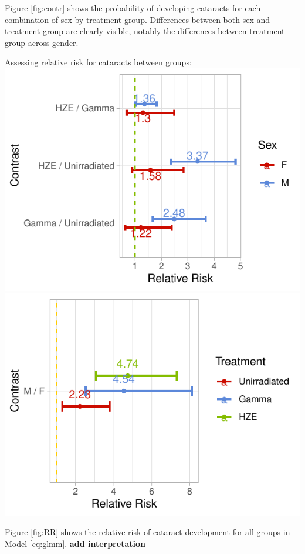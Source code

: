 \documentclass[12pt]{article}
\begin{document}
Figure \ref{fig:contr} shows the probability of developing cataracts for each combination of sex by treatment group. Differences between both sex and treatment group are clearly visible, notably the differences between treatment group across gender.

Assessing relative risk for cataracts between groups:\\
\includegraphics{bookdown_report_files/figure-latex/RR-1.pdf} \includegraphics{bookdown_report_files/figure-latex/RR-2.pdf}

Figure \ref{fig:RR} shows the relative risk of cataract development for all groups in Model \eqref{eq:glmm}. \textbf{add interpretation}
\end{document}
